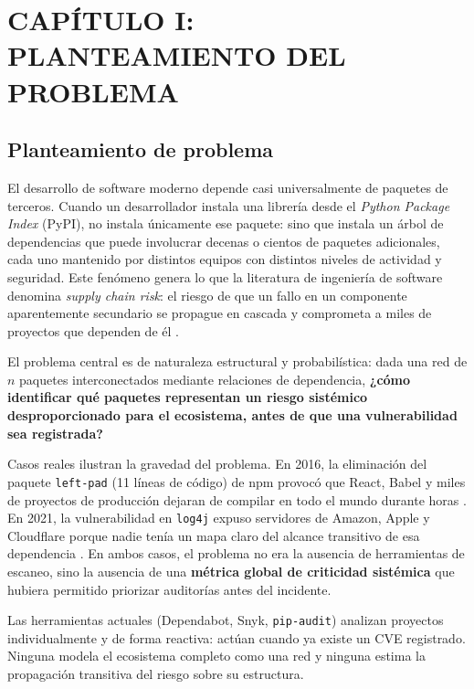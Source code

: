 \section{CAPÍTULO I: PLANTEAMIENTO DEL PROBLEMA}

\subsection{Planteamiento de problema}

El desarrollo de software moderno depende casi universalmente de paquetes de terceros.
Cuando un desarrollador instala una librería desde el \textit{Python Package Index}
(PyPI), no instala únicamente ese paquete: sino que instala un árbol de dependencias que puede
involucrar decenas o cientos de paquetes adicionales, cada uno mantenido por distintos
equipos con distintos niveles de actividad y seguridad. Este fenómeno genera lo que
la literatura de ingeniería de software denomina \textit{supply chain risk}: el riesgo
de que un fallo en un componente aparentemente secundario se propague en cascada y
comprometa a miles de proyectos que dependen de él \autocite{zimmermann2019small}.

El problema central es de naturaleza estructural y probabilística: dada una red de
$n$ paquetes interconectados mediante relaciones de dependencia, \textbf{¿cómo
identificar qué paquetes representan un riesgo sistémico desproporcionado para el
ecosistema, antes de que una vulnerabilidad sea registrada?}

Casos reales ilustran la gravedad del problema. En 2016, la eliminación del paquete
\texttt{left-pad} (11 líneas de código) de npm provocó que React, Babel y miles de
proyectos de producción dejaran de compilar en todo el mundo durante horas
\autocite{decan2019impact}. En 2021, la vulnerabilidad en \texttt{log4j} expuso
servidores de Amazon, Apple y Cloudflare porque nadie tenía un mapa claro del
alcance transitivo de esa dependencia \autocite{cve-2021-44228}. En ambos casos, el problema no era la
ausencia de herramientas de escaneo, sino la ausencia de una \textbf{métrica
global de criticidad sistémica} que hubiera permitido priorizar auditorías antes
del incidente.

Las herramientas actuales (Dependabot, Snyk, \texttt{pip-audit}) analizan proyectos
individualmente y de forma reactiva: actúan cuando ya existe un CVE registrado.
Ninguna modela el ecosistema completo como una red y ninguna estima la propagación
transitiva del riesgo sobre su estructura.

